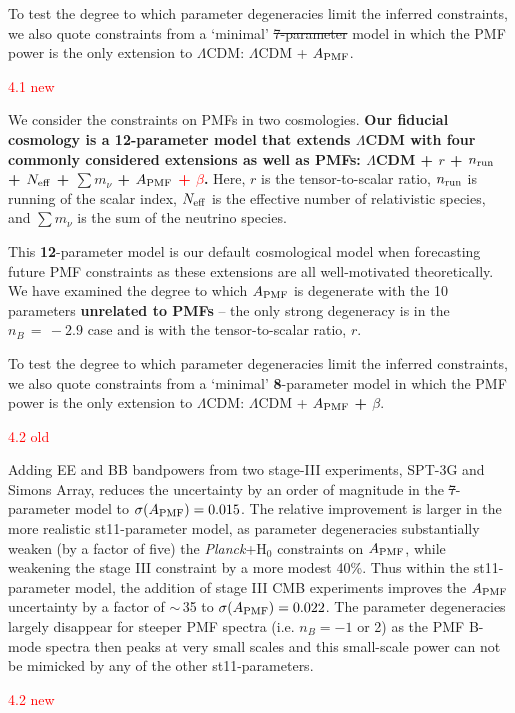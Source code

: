 \documentclass{article}
\newcommand{\apmf}{\ensuremath{A_{\rm PMF}}}
\newcommand{\lcdm}{\ensuremath{\Lambda}CDM}
\newcommand{\nrun}{\ensuremath{n_{\rm run}}}
\newcommand{\neff}{\ensuremath{N_{\rm eff}}}
\newcommand{\ho}{H\ensuremath{_0}}
\newcommand{\mnu}{\ensuremath{\sum m_\nu}}
\newcommand{\planck}{{\sl Planck}}
\newcommand{\sptnew}{SPT-3G}
\newcommand{\simons}{Simons Array}
\newcommand{\changed}[1]{\textcolor{Red}{#1}}
\newcommand{\removed}[1]{\st{#1}}
\newcommand{\added}[1]{\textbf{#1}}
\begin{document}
To test the degree to which parameter degeneracies limit the inferred constraints,  we also quote constraints from a `minimal' \removed{7-parameter} model in which the PMF power is the only extension to \lcdm{}:  \lcdm{} + \apmf.

\changed{4.1 new}

We consider the constraints on PMFs in two cosmologies. 
\added{Our fiducial cosmology is a \added{12}-parameter model that extends \lcdm{} with  four  commonly considered extensions as well as PMFs:  \lcdm{} +  $r$ + \nrun{} +  \neff{} + \mnu{} + \apmf{} \changed{ + $\beta$}.}
Here, $r$ is the tensor-to-scalar ratio, \nrun{} is running of the scalar index, \neff{} is the effective number of relativistic species, and \mnu{} is the sum of the neutrino species.

This \added{12}-parameter model is our default cosmological model when forecasting future PMF constraints as these extensions are all well-motivated theoretically. 
We have examined the degree to which \apmf{} is degenerate with the 10 parameters \added{unrelated to PMFs} -- the only strong degeneracy is in the $n_B\,=\,-2.9$ case and is with the tensor-to-scalar ratio, $r$. 

To test the degree to which parameter degeneracies limit the inferred constraints,  we also quote constraints from a `minimal' \added{8}-parameter model in which the PMF power is the only extension to \lcdm{}:  \lcdm{} + \apmf{} \added{ + $\beta$}.

\changed{4.2 old}

Adding  EE and BB bandpowers from two stage-III experiments, \sptnew{} and \simons{}, reduces the uncertainty by an order of magnitude in the \st{7}-parameter model to $\sigma(\apmf)=0.015$. 
The relative improvement is larger in the more realistic st{11}-parameter model, as parameter degeneracies substantially weaken (by a factor of five) the \planck+\ho{} constraints on \apmf{}, while weakening the stage III constraint by a  more modest 40\%. 
Thus within the st{11}-parameter model,  the addition of stage III CMB experiments improves the \apmf{} uncertainty by a factor of $\sim$\,35 to  $\sigma(\apmf)=0.022$. 
The parameter degeneracies largely disappear for steeper PMF spectra (i.e. $n_B=-1$ or 2) as the PMF B-mode spectra then peaks at very small scales and this small-scale power can not be mimicked by any of the other st{11}-parameters. 

\changed{4.2 new}
\end{document}
